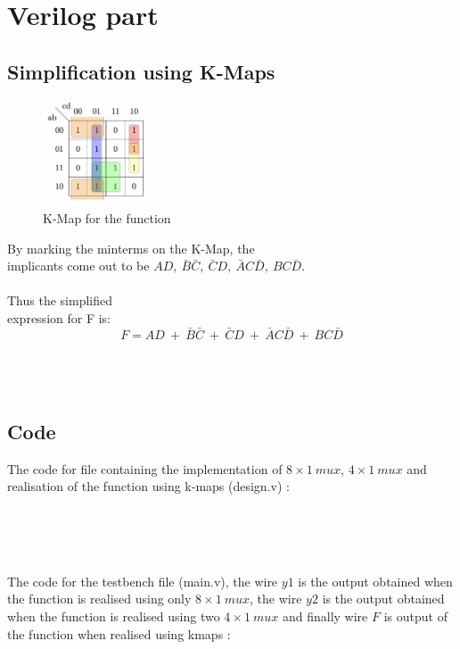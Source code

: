 \documentclass[12pt]{article}
\begin{document}
\section{Verilog part}
\subsection{Simplification using K-Maps}
\begin{figure}
    \begin{center}
      \includegraphics[width=0.3\textwidth]{k-map.png}
    \end{center}
    \caption{K-Map for the function}
  \end{figure}
  By marking the minterms on the K-Map, the \\implicants come out to be $AD,\ \bar{B}\bar{C},\ \bar{C}D,\ \bar{A}C\bar{D},\ BC\bar{D}$.\\
  \\ Thus the simplified \\expression for F is:
  $$F = AD\ +\ \bar{B}\bar{C}\ +\ \bar{C}D\ +\ \bar{A}C\bar{D}\ +\ BC\bar{D}$$
\\ \\ \\
\subsection{Code}
The code for file containing the implementation of $8\times1\ mux$, $4\times1\ mux$ and realisation of the function using k-maps (design.v) : 
\inputminted[bgcolor=bg,frame=lines,framesep=2mm,numbers=left]
{Verilog}{./code_files/design.v}
\\ \\ \\
The code for the testbench file (main.v), the wire $y1$ is the output obtained when the function is realised using only $8\times1\ mux$, the wire $y2$ is the output obtained when the function is realised using two $4\times1\ mux$ and finally wire $F$ is output of the function when realised using kmaps  :
\inputminted[bgcolor=bg,frame=lines,framesep=2mm,numbers=left]
{Verilog}{./code_files/main.v}
\\ \\ \\ \\ \\
\end{document}
